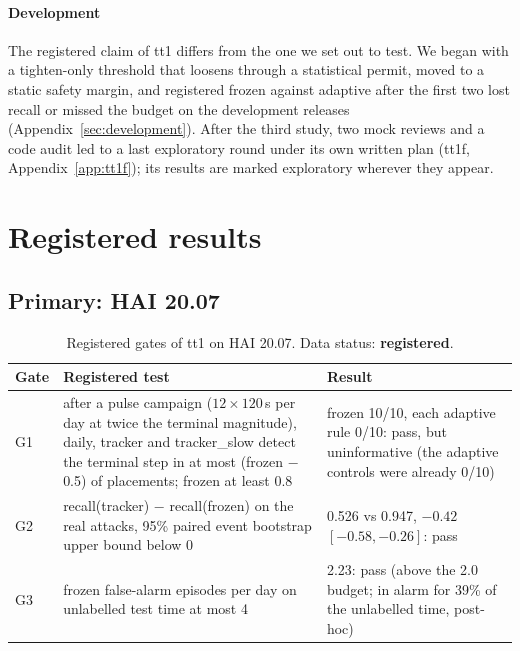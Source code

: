 \documentclass[sigconf,review,anonymous]{acmart}
\begin{document}
\paragraph{Development}
The registered claim of tt1 differs from the one we set out to test. We began with a tighten-only
threshold that loosens through a statistical permit, moved to a static safety margin, and registered
frozen against adaptive after the first two lost recall or missed the budget on the development
releases (Appendix~\ref{sec:development}). After the third study, two mock reviews and a code audit
led to a last exploratory round under its own written plan (tt1f, Appendix~\ref{app:tt1f}); its results
are marked exploratory wherever they appear.

\section{Registered results}
\label{sec:registered}

\subsection{Primary: HAI 20.07}

\begin{table}[t]
\caption{Registered gates of tt1 on HAI 20.07. Data status: \textbf{registered}.}
\label{tab:gates}
\begin{tabular}{@{}p{}p{}p{}@{}}
\toprule
Gate & Registered test & Result \\
\midrule
G1 & after a pulse campaign ($12 \times 120$\,s per day at twice the terminal magnitude), daily, tracker and tracker\_slow detect the terminal step in at most (frozen $-$ 0.5) of placements; frozen at least 0.8 & frozen 10/10, each adaptive rule 0/10: pass, but uninformative (the adaptive controls were already 0/10) \\
G2 & recall(tracker) $-$ recall(frozen) on the real attacks, 95\% paired event bootstrap upper bound below 0 & 0.526 vs 0.947, $-0.42$ $[-0.58, -0.26]$: pass \\
G3 & frozen false-alarm episodes per day on unlabelled test time at most 4 & 2.23: pass (above the 2.0 budget; in alarm for 39\% of the unlabelled time, post-hoc) \\
\bottomrule
\end{tabular}
\end{table}
\end{document}
